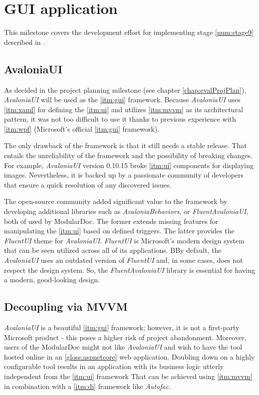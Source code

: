 \chapter{GUI application}

This milestone covers the development effort for implementing stage \ref{num:stage9} described in .

\section{AvaloniaUI}

As decided in the project planning milestone (see chapter \ref{chap:evalProjPlan}), \textit{AvaloniaUI} will be used as the \ref{itm:gui} framework.
Because \textit{AvaloniaUI} uses \ref{itm:xaml} for defining the \ref{itm:ui} and utilizes \ref{itm:mvvm} as its architectural pattern, it was not too difficult to use it thanks to previous experience with \ref{itm:wpf} (Microsoft's official \ref{itm:gui} framework).

The only drawback of the framework is that it still needs a stable release. That entails the unreliability of the framework and the possibility of breaking changes. For example, \textit{AvaloniaUI} version 0.10.15 broke \ref{itm:ui} components for displaying images. Nevertheless, it is backed up by a passionate community of developers that ensure a quick resolution of any discovered issues.

The open-source community added significant value to the framework by developing additional libraries such as \textit{AvaloniaBehaviors}, or \textit{FluentAvaloniaUI}, both of used by ModularDoc. The former extends missing features for manipulating the \ref{itm:ui} based on defined triggers. The latter provides the \textit{FluentUI} theme for \textit{AvaloniaUI}. \textit{FluentUI} is Microsoft's modern design system that can be seen utilized across all of its applications. BBy default, the \textit{AvaloniaUI} uses an outdated version of \textit{FluentUI} and, in some cases, does not respect the design system. So, the \textit{FluentAvaloniaUI} library is essential for having a modern, good-looking design.

\section{Decoupling via MVVM}

\textit{AvaloniaUI} is a beautiful \ref{itm:gui} framework; however, it is not a first-party Microsoft product - this poses a higher risk of project abandonment. Moreover, users of the ModularDoc might not like \textit{AvaloniaUI} and wish to have the tool hosted online in an \ref{gloss:aspnetcore} web application. Doubling down on a highly configurable tool results in an application with its business logic utterly independent from the \ref{itm:ui} framework
That can be achieved using \ref{itm:mvvm} in combination with a \ref{itm:di} framework like \textit{Autofac}.

